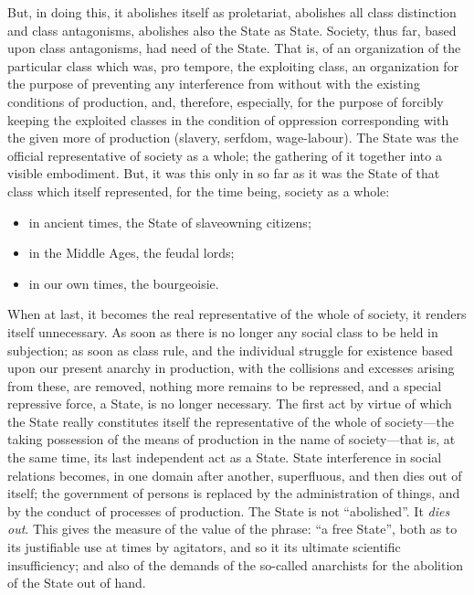 But, in doing this, it abolishes itself as proletariat, abolishes all class
distinction and class antagonisms, abolishes also the State as State. Society,
thus far, based upon class antagonisms, had need of the State. That is, of an
organization of the particular class which was, pro tempore, the exploiting
class, an organization for the purpose of preventing any interference from
without with the existing conditions of production, and, therefore, especially,
for the purpose of forcibly keeping the exploited classes in the condition of
oppression corresponding with the given more of production (slavery, serfdom,
wage-labour). The State was the official representative of society as a whole;
the gathering of it together into a visible embodiment. But, it was this only in
so far as it was the State of that class which itself represented, for the time
being, society as a whole:
%
\begin{itemize}
  \item{in ancient times, the State of slaveowning citizens;}
  \item{in the Middle Ages, the feudal lords;}
  \item{in our own times, the bourgeoisie.}
\end{itemize}
%
When at last, it becomes the real representative of the whole of society, it
renders itself unnecessary. As soon as there is no longer any social class to be
held in subjection; as soon as class rule, and the individual struggle for
existence based upon our present anarchy in production, with the collisions and
excesses arising from these, are removed, nothing more remains to be repressed,
and a special repressive force, a State, is no longer necessary. The first act
by virtue of which the State really constitutes itself the representative of the
whole of society---the taking possession of the means of production in the name
of society---that is, at the same time, its last independent act as a State.
State interference in social relations becomes, in one domain after another,
superfluous, and then dies out of itself; the government of persons is replaced
by the administration of things, and by the conduct of processes of production.
The State is not ``abolished''. It \emph{dies out}. This gives the measure of
the value of the phrase: ``a free State'', both as to its justifiable use at
times by agitators, and so it its ultimate scientific insufficiency; and also of
the demands of the so-called anarchists for the abolition of the State out of
hand.

